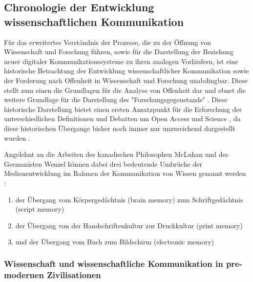 \subsection{Chronologie der Entwicklung wissenschaftlichen Kommunikation}

Für das erweitertes Verständnis der Prozesse, die zu der Öffnung von Wissenschaft und Forschung führen, sowie für die Darstellung der Beziehung neuer digitaler Kommunikationssysteme zu ihren analogen Vorläufern, ist eine historische Betrachtung der Entwicklung wissenschaftlicher Kommunikation sowie der Forderung nach Offenheit in Wissenschaft und Forschung unabdingbar. Diese stellt zum einen die Grundlagen für die Analyse von Offenheit dar und ebnet die weitere Grundlage für die Darstellung  des "Forschungsgegenstands" \cite{cite:10}. Diese historische Darstellung bietet einen ersten Ansatzpunkt für die Erforschung der unterschiedlichen Definitionen und Debatten um Open Access und Science \cite{Scheliga_2014}, da diese historischen Übergange bisher noch immer nur unzureichend dargestellt wurden \cite{CREATe_2014}.

Angelehnt an die Arbeiten des kanadischen Philosophen McLuhan und des Germanisten Wenzel können dabei drei bedeutende Umbrüche der Medienentwicklung im Rahmen der Kommunikation von Wissen genannt werden \cite{wunderlich_2008_buchdruck} \cite{wenzel_mediengeschichte_2007}:
\begin{enumerate}
\item der Übergang vom Körpergedächtnis (brain memory) zum Schriftgedächtnis (script memory)
\item der Übergang von der Handschriftenkultur zur Druckkultur (print memory)
\item und der Übergang vom Buch zum Bildschirm (electronic memory)
\end{enumerate}

\subsubsection{Wissenschaft und wissenschaftliche Kommunikation in pre-modernen Zivilisationen}

